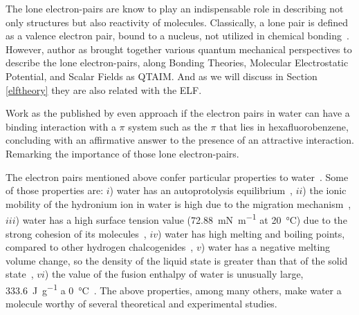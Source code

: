The lone electron-pairs are know to play an indispensable role in describing
not only structures but also reactivity of molecules. Classically, a lone pair
is defined as a valence electron pair, bound to a nucleus, not utilized in
chemical bonding~\cite{Lee1996-hp}. However, author as \citet{Kumar2014}
brought together various quantum mechanical perspectives to describe the lone
electron-pairs, along Bonding Theories, Molecular Electrostatic Potential, and
Scalar Fields as QTAIM. And as we will discuss in Section \ref{elftheory} they
are also related with the ELF.

Work as the published by \citet{Gallivan1999} even approach if the electron
pairs in water can have a binding interaction with a $\pi$ system such as the
$\pi$ that lies in hexafluorobenzene, concluding with an affirmative answer to
the presence of an attractive interaction. Remarking the importance of
those lone electron-pairs.

The electron pairs mentioned above confer particular properties to
water~\cite{biology}. Some of those properties are:
$i$) water has an autoprotolysis equilibrium~\cite{mcmurry},
$ii$) the ionic mobility of the hydronium ion in water is high due to the migration mechanism~\cite{voet},
$iii$) water has a high surface tension value (\SI{72.88}{\milli \newton \per \meter} at \SI{20}{\celsius}) due to the strong cohesion of its molecules~\cite{dean92:LHC},
$iv$) water has high melting and boiling points, compared to other hydrogen chalcogenides~\cite{morrison},
$v$) water has a negative melting volume change, so the density of the liquid state is greater than that of the solid state~\cite{serway2001fisica},
$vi$) the value of the fusion enthalpy of water is unusually large,
\SI{333.6}{\joule \per \gram} a \SI{0}{\celsius}~\cite{noauthororeditor2007handbook}.
The above properties, among many others, make water a molecule worthy of several theoretical and experimental studies.




